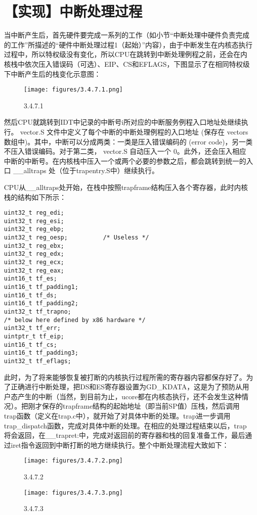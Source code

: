 \section{【实现】中断处理过程}\label{ux5b9eux73b0ux4e2dux65adux5904ux7406ux8fc7ux7a0b}

当中断产生后，首先硬件要完成一系列的工作（如小节``中断处理中硬件负责完成的工作''所描述的``硬件中断处理过程1（起始）''内容），由于中断发生在内核态执行过程中，所以特权级没有变化，所以CPU在跳转到中断处理例程之前，还会在内核栈中依次压入错误码（可选）、EIP、CS和EFLAGS，下图显示了在相同特权级下中断产生后的栈变化示意图：

\begin{figure}[htbp]
\centering
\texttt{[image: figures/3.4.7.1.png]}
\caption{3.4.7.1}
\end{figure}

然后CPU就跳转到IDT中记录的中断号i所对应的中断服务例程入口地址处继续执行。
vector.S 文件中定义了每个中断的中断处理例程的入口地址 (保存在 vectors
数组中)。其中，中断可以分成两类：一类是压入错误编码的 (error
code)，另一类不压入错误编码。对于第二类， vector.S 自动压入一个
0。此外，还会压入相应中断的中断号。在内核栈中压入一个或两个必要的参数之后，都会跳转到统一的入口
\_\_alltraps 处（位于trapentry.S中）继续执行。

CPU从\_\_alltraps处开始，在栈中按照trapframe结构压入各个寄存器，此时内核栈的结构如下所示：

\begin{lstlisting}
uint32_t reg_edi;
uint32_t reg_esi;
uint32_t reg_ebp;
uint32_t reg_oesp;          /* Useless */
uint32_t reg_ebx;
uint32_t reg_edx;
uint32_t reg_ecx;
uint32_t reg_eax;   
uint16_t tf_es;
uint16_t tf_padding1;
uint16_t tf_ds;
uint16_t tf_padding2;
uint32_t tf_trapno;
/* below here defined by x86 hardware */
uint32_t tf_err;
uintptr_t tf_eip;
uint16_t tf_cs;
uint16_t tf_padding3;
uint32_t tf_eflags;
\end{lstlisting}

此时，为了将来能够恢复被打断的内核执行过程所需的寄存器内容都保存好了。为了正确进行中断处理，把DS和ES寄存器设置为GD\_KDATA，这是为了预防从用户态产生的中断（当然，到目前为止，ucore都在内核态执行，还不会发生这种情况）。把刚才保存的trapframe结构的起始地址（即当前SP值）压栈，然后调用
trap函数（定义在trap.c中），就开始了对具体中断的处理。trap进一步调用trap\_dispatch函数，完成对具体中断的处理。在相应的处理过程结束以后，trap将会返回，在\_\_trapret:中，完成对返回前的寄存器和栈的回复准备工作，最后通过iret指令返回到中断打断的地方继续执行。整个中断处理流程大致如下：

\begin{figure}[htbp]
\centering
\texttt{[image: figures/3.4.7.2.png]}
\caption{3.4.7.2}
\end{figure}

\begin{figure}[htbp]
\centering
\texttt{[image: figures/3.4.7.3.png]}
\caption{3.4.7.3}
\end{figure}
